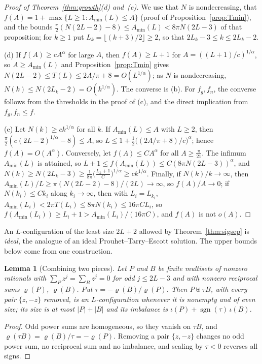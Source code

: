 \documentclass[pdflatex,sn-mathphys-num]{sn-jnl}
\theoremstyle{thmstyleone}%
\newtheorem{lemma}[theorem]{Lemma}%
\theoremstyle{thmstylethree}%
\begin{document}
\begin{proof}[Proof of Theorem~\ref{thm:growth}(d) and~(e)]
We use that $N$ is nondecreasing, that $f(A)=1+\max\{L\ge1:A_{\min}(L)\le A\}$ (proof of Proposition~\ref{prop:Tmin}), and the bounds $\frac\pi2(N(2L-2)-8)\le A_{\min}(L)<8\pi N(2L-3)$ of that proposition; for $k\ge1$ put $L_k=\lfloor(k+3)/2\rfloor\ge2$, so that $2L_k-3\le k\le2L_k-2$.

(d) If $f(A)\ge cA^\alpha$ for large $A$, then $f(A)\ge L+1$ for $A=((L+1)/c)^{1/\alpha}$, so $A\ge A_{\min}(L)$ and Proposition~\ref{prop:Tmin} gives $N(2L-2)\le T(L)\le2A/\pi+8=O(L^{1/\alpha})$; as $N$ is nondecreasing, $N(k)\le N(2L_k-2)=O(k^{1/\alpha})$. The converse is (b). For $f_g,f_n$, the converse follows from the thresholds in the proof of (c), and the direct implication from $f_g,f_n\le f$.

(e) Let $N(k)\ge ck^{1/\alpha}$ for all $k$. If $A_{\min}(L)\le A$ with $L\ge2$, then $\frac\pi2(c(2L-2)^{1/\alpha}-8)\le A$, so $L\le1+\frac12\big((2A/\pi+8)/c\big)^\alpha$; hence $f(A)=O(A^\alpha)$. Conversely, let $f(A)\le CA^\alpha$ for all $A\ge\frac\pi{21}$. The infimum $A_{\min}(L)$ is attained, so $L+1\le f(A_{\min}(L))\le C(8\pi N(2L-3))^\alpha$, and $N(k)\ge N(2L_k-3)\ge\frac1{8\pi}\big(\frac{L_k+1}C\big)^{1/\alpha}\ge ck^{1/\alpha}$. Finally, if $N(k)/k\to\infty$, then $A_{\min}(L)/L\ge\pi(N(2L-2)-8)/(2L)\to\infty$, so $f(A)/A\to0$; if $N(k_i)\le Ck_i$ along $k_i\to\infty$, then with $L_i=L_{k_i}$, $A_{\min}(L_i)<2\pi T(L_i)\le8\pi N(k_i)\le16\pi CL_i$, so $f(A_{\min}(L_i))\ge L_i+1>A_{\min}(L_i)/(16\pi C)$, and $f(A)$ is not $o(A)$.
\end{proof}

An $L$-configuration of the least size $2L+2$ allowed by Theorem~\ref{thm:sigsep} is \emph{ideal}, the analogue of an ideal Prouhet--Tarry--Escott solution. The upper bounds below come from one construction.

\begin{lemma}[Combining two pieces]\label{lem:combine}
Let $P$ and $B$ be finite multisets of nonzero rationals with $\sum_Pz^j=\sum_Bz^j=0$ for odd $j\le2L-3$ and with nonzero reciprocal sums $\varrho(P)$, $\varrho(B)$. Put $\tau=-\varrho(B)/\varrho(P)$. Then $P\uplus\tau B$, with every pair $\{z,-z\}$ removed, is an $L$-configuration whenever it is nonempty and of even size; its size is at most $|P|+|B|$ and its imbalance is $\iota(P)+\operatorname{sgn}(\tau)\,\iota(B)$.
\end{lemma}

\begin{proof}
Odd power sums are homogeneous, so they vanish on $\tau B$, and $\varrho(\tau B)=\varrho(B)/\tau=-\varrho(P)$. Removing a pair $\{z,-z\}$ changes no odd power sum, no reciprocal sum and no imbalance, and scaling by $\tau<0$ reverses all signs.
\end{proof}
\end{document}
